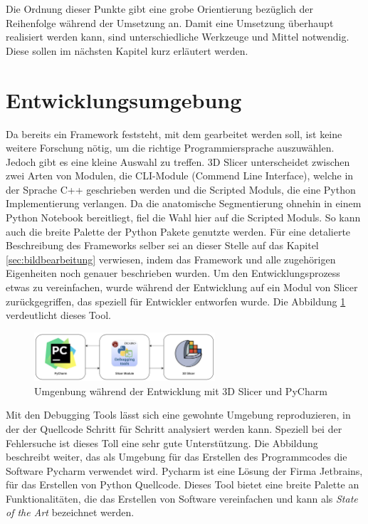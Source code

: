 Die Ordnung dieser Punkte gibt eine grobe Orientierung bezüglich der Reihenfolge
während der Umsetzung an. Damit eine Umsetzung überhaupt realisiert werden kann,
sind unterschiedliche Werkzeuge und Mittel notwendig. Diese sollen im nächsten
Kapitel kurz erläutert werden.

\section{Entwicklungsumgebung}
Da bereits ein Framework feststeht, mit dem gearbeitet werden soll, ist keine
weitere Forschung nötig, um die richtige Programmiersprache auszuwählen. Jedoch
gibt es eine kleine Auswahl zu treffen. 3D Slicer unterscheidet zwischen zwei Arten
von Modulen, die CLI-Module (Commend Line Interface), welche in der Sprache C++ geschrieben
werden und die Scripted Moduls, die eine Python Implementierung verlangen. Da die
anatomische Segmentierung ohnehin in einem Python Notebook bereitliegt, fiel die
Wahl hier auf die Scripted Moduls. So kann auch die breite Palette der Python Pakete
genutzte werden. Für eine detalierte Beschreibung des Frameworks selber sei an
dieser Stelle auf das Kapitel \ref{sec:bildbearbeitung} verwiesen, indem das Framework
und alle zugehörigen Eigenheiten noch genauer beschrieben wurden. Um den
Entwicklungsprozess etwas zu vereinfachen, wurde während der Entwicklung auf ein
Modul von Slicer zurückgegriffen, das speziell für Entwickler entworfen wurde. Die
Abbildung \ref{fig:entwicklungsumgebung} verdeutlicht dieses Tool.

\begin{figure}[h]
	\centering
	\includegraphics[width=0.6\textwidth]{img/Entwicklungsumgebung.png}
	\caption{Umgenbung während der Entwicklung mit 3D Slicer und PyCharm}
	\label{fig:entwicklungsumgebung}
\end{figure}

Mit den Debugging Tools lässt sich eine gewohnte Umgebung reproduzieren, in der der
Quellcode Schritt für Schritt analysiert werden kann. Speziell bei der
Fehlersuche ist dieses Toll eine sehr gute Unterstützung. Die Abbildung beschreibt
weiter, das als Umgebung für das Erstellen des Programmcodes die Software
Pycharm verwendet wird. Pycharm ist eine Lösung der Firma Jetbrains, für das
Erstellen von Python Quellcode. Dieses Tool bietet eine breite Palette an Funktionalitäten,
die das Erstellen von Software vereinfachen und kann als \textit{State of the
Art} bezeichnet werden.

